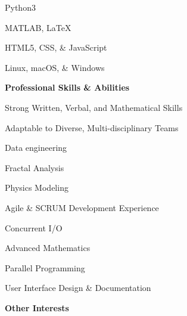 \documentclass[letterpaper,final]{memoir}
\newcommand{\Sep}{\vspace{1.0em}}
\newcommand{\SmallSep}{\vspace{0.4em}}
\newcommand{\CVItem}[1]
	{\textbf{\color{Blue} #1}}
\begin{document}
\begin{multicols}{1}

    \begin{compactitem}[\color{Blue}$\circ$]
		
		\item Python3
       

        \item MATLAB, LaTeX
		

        \item HTML5, CSS, \& JavaScript
        

        \item Linux, macOS, \& Windows
       
    
	\end{compactitem}

\end{multicols}

\Sep
\CVItem{Professional Skills \& Abilities}
\Sep

\begin{multicols}{2}

    \begin{compactitem}[\color{Blue}$\circ$]

        \item Strong Written, Verbal, and Mathematical Skills
        \item Adaptable to Diverse, Multi-disciplinary Teams
        \item Data engineering
        \item Fractal Analysis
        \item Physics Modeling
        \SmallSep
   
        \item Agile \& SCRUM Development Experience
        \item Concurrent I/O
        \item Advanced Mathematics
        \item Parallel Programming
        \item User Interface Design \&  Documentation
        \SmallSep
        
	\end{compactitem}

\end{multicols}



\CVItem{Other Interests}
\Sep
\end{document}
